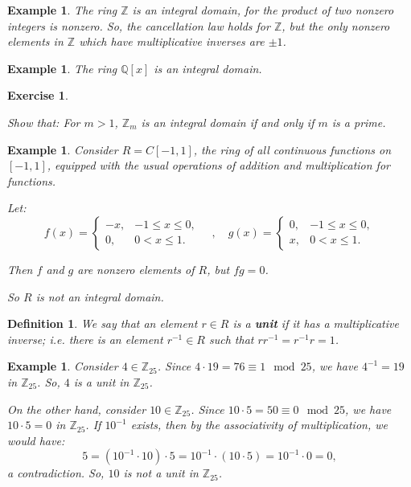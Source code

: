 \documentclass[a4paper,12pt]{report}
\newcounter{statement}
\numberwithin{statement}{chapter}
\newtheorem{defn}[statement]{Definition}
\newtheorem{eg}[statement]{\bf Example}
\newtheorem{ex}[statement]{\bf Exercise}
\numberwithin{equation}{chapter}
\numberwithin{section}{chapter}
\numberwithin{subsection}{section}
\begin{document}
\begin{eg}
The ring $\mathbb{Z}$ is an integral domain, for the product of two nonzero integers is nonzero.
So, the cancellation law holds for $\mathbb{Z}$, but the only nonzero elements in $\mathbb{Z}$
which have multiplicative inverses are $\pm 1$.
\end{eg}



\begin{eg}

The ring $\mathbb{Q}[x]$ is an integral domain.

\end{eg}



\begin{ex}
\label{ex:zmintdom}



Show that:
For $m > 1$,
$\mathbb{Z}_m$ is an integral domain if and only if $m$ is a prime.
\end{ex}

\begin{eg}
Consider $R = C[-1, 1]$, the ring of all continuous functions on $[-1, 1]$, equipped with
the usual operations of addition and multiplication for functions.


Let:
\[
f(x) = \begin{cases}
-x, & -1 \leq x \leq 0,\\
0, & 0 < x \leq 1.
\end{cases}
\quad,\quad
g(x) = \begin{cases}
0, & -1 \leq x \leq 0,\\
x, & 0 < x \leq 1.
\end{cases}
\]

Then $f$ and $g$ are nonzero elements of $R$, but $fg = 0$.


So $R$ is not an integral domain.

\end{eg}




\begin{defn}
We say that an element $r \in R$ is a  {\bf unit} 
if it has a multiplicative inverse; i.e.
there is an element $r^{-1} \in R$ such that $rr^{-1} = r^{-1} r = 1$.
\end{defn}



\begin{eg}

Consider $4 \in \mathbb{Z}_{25}$.  Since $4\cdot 19 = 76 \equiv 1 \mod 25$,
we have $4^{-1} = 19$ in $\mathbb{Z}_{25}$.  So, $4$ is a unit in $\mathbb{Z}_{25}$.




On the other hand, consider $10 \in \mathbb{Z}_{25}$.  Since $10 \cdot 5 = 50 \equiv 0 \mod 25$,
we have $10 \cdot 5 = 0$ in $\mathbb{Z}_{25}$.  If $10^{-1}$ exists, then by the associativity
of multiplication, we would have:
\[
5 = (10^{-1}\cdot 10)\cdot 5 = 10^{-1} \cdot (10 \cdot 5) = 10^{-1} \cdot 0 = 0,
\]
a contradiction.  So, $10$ is not a unit in $\mathbb{Z}_{25}$.

\end{eg}
\end{document}
